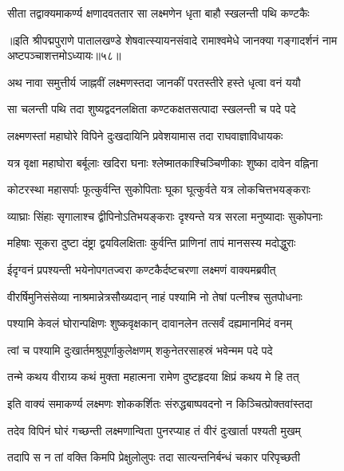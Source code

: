 \twolineshloka
{सीता तद्वाक्यमाकर्ण्य क्षणादवततार सा}
{लक्ष्मणेन धृता बाहौ स्खलन्ती पथि कण्टकैः}%

{॥इति श्रीपद्मपुराणे पातालखण्डे शेषवात्स्यायनसंवादे रामाश्वमेधे जानक्या गङ्गादर्शनं नाम अष्टपञ्चाशत्तमोऽध्यायः॥५८॥}



\twolineshloka
{अथ नावा समुत्तीर्य जाह्नवीं लक्ष्मणस्तदा}
{जानकीं परतस्तीरे हस्ते धृत्वा वनं ययौ}%

\twolineshloka
{सा चलन्ती पथि तदा शुष्यद्वदनलक्षिता}
{कण्टकक्षतसत्पादा स्खलन्ती च पदे पदे}%

\twolineshloka
{लक्ष्मणस्तां महाघोरे विपिने दुःखदायिनि}
{प्रवेशयामास तदा राघवाज्ञाविधायकः}%

\twolineshloka
{यत्र वृक्षा महाघोरा बर्बूलाः खदिरा घनाः}
{श्लेष्मातकाश्चिञ्चिणीकाः शुष्का दावेन वह्निना}%

\twolineshloka
{कोटरस्था महासर्पाः फूत्कुर्वन्ति सुकोपिताः}
{घूका घूत्कुर्वते यत्र लोकचित्तभयङ्कराः}%

\twolineshloka
{व्याघ्राः सिंहाः सृगालाश्च द्वीपिनोऽतिभयङ्कराः}
{दृश्यन्ते यत्र सरला मनुष्यादाः सुकोपनाः}%

\twolineshloka
{महिषाः सूकरा दुष्टा दंष्ट्रा द्वयविलक्षिताः}
{कुर्वन्ति प्राणिनां तापं मानसस्य मदोद्धुराः}%

\twolineshloka
{ईदृग्वनं प्रपश्यन्ती भयेनोपगतज्वरा}
{कण्टकैर्दष्टचरणा लक्ष्मणं वाक्यमब्रवीत्}%


\twolineshloka
{वीरर्षिमुनिसंसेव्या नाश्रमान्नेत्रसौख्यदान्}
{नाहं पश्यामि नो तेषां पत्नीश्च सुतपोधनाः}%

\twolineshloka
{पश्यामि केवलं घोरान्पक्षिणः शुष्कवृक्षकान्}
{दावानलेन तत्सर्वं दह्यमानमिदं वनम्}%

\twolineshloka
{त्वां च पश्यामि दुःखार्तमश्रुपूर्णाकुलेक्षणम्}
{शकुनेतरसाहस्रं भवेन्मम पदे पदे}%

\twolineshloka
{तन्मे कथय वीराग्र्य कथं मुक्ता महात्मना}
{रामेण दुष्टहृदया क्षिप्रं कथय मे हि तत्}%

\twolineshloka
{इति वाक्यं समाकर्ण्य लक्ष्मणः शोककर्शितः}
{संरुद्धबाष्पवदनो न किञ्चित्प्रोक्तवांस्तदा}%

\twolineshloka
{तदेव विपिनं घोरं गच्छन्ती लक्ष्मणान्विता}
{पुनरप्याह तं वीरं दुःखार्ता पश्यती मुखम्}%

\twolineshloka
{तदापि स न तां वक्ति किमपि प्रेक्षुलोलुपः}
{तदा सात्यन्तनिर्बन्धं चकार परिपृच्छती}%


